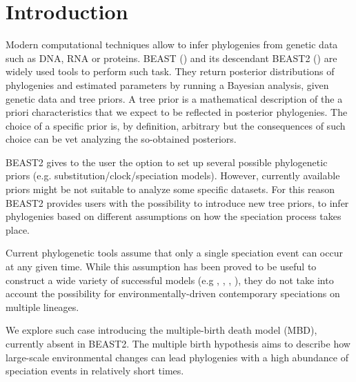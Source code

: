 \section{Introduction}


Modern computational techniques allow to infer phylogenies from genetic data 
such as DNA, RNA or proteins. BEAST (\cite{beast}) and its descendant 
BEAST2 (\cite{beast2}) are widely used tools to perform such task. They 
return posterior distributions of phylogenies and estimated parameters by running a Bayesian analysis, given genetic data and tree priors. A tree prior is a mathematical description of the a priori characteristics that we expect to be reflected in posterior phylogenies. The choice of a specific prior is, by definition, arbitrary but the consequences of such choice can be vet analyzing the so-obtained posteriors.

BEAST2 gives to the user the option to set up several possible phylogenetic priors (e.g. substitution/clock/speciation models). However, currently available priors might be not suitable to analyze some specific datasets.
For this reason BEAST2 provides users with the possibility to introduce new tree priors, to infer phylogenies based on different assumptions on how the speciation process takes place.

Current phylogenetic tools assume that only a single speciation event can occur at any given time.
While this assumption has been proved to be useful to construct a wide variety of successful models (e.g \cite{Maddison2007biSSE}, \cite{Valente2015}, \cite{etienne2012diversity}, \cite{etienne2014estimating}), they do not take into account the possibility for environmentally-driven contemporary speciations on multiple lineages.

We explore such case introducing the multiple-birth death model (MBD), 
currently absent in BEAST2. 
The multiple birth hypothesis aims to describe how 
large-scale environmental changes can lead phylogenies 
with a high abundance of speciation events in relatively short times.

\iffalse
\giovanni{This might be good for the abstract}
The (constant-rate) birth-death (BD) model embodies the common assumption 
that only a single speciation event can occur at any given time. 
The multiple-birth-death (MBD) model relaxes this assumption allowing, 
in addition to standard BD events, 
also events in which large-scale environmental changes lead 
to speciation bursts.
\fi

